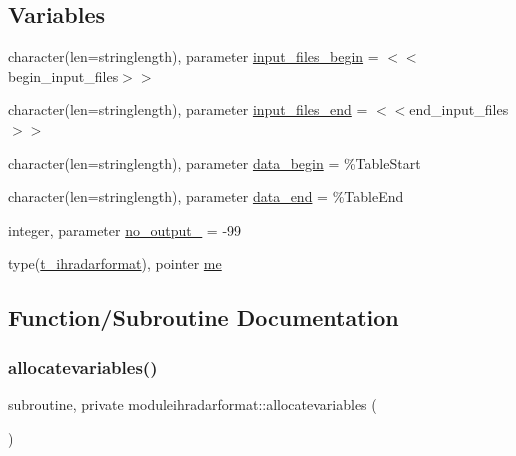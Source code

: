 \subsection*{Variables}
\begin{DoxyCompactItemize}
\item 
character(len=stringlength), parameter \mbox{\hyperlink{namespacemoduleihradarformat_a872caa24e241015b723a32676f702a85}{input\+\_\+files\+\_\+begin}} = \textquotesingle{}$<$$<$begin\+\_\+input\+\_\+files$>$$>$\textquotesingle{}
\item 
character(len=stringlength), parameter \mbox{\hyperlink{namespacemoduleihradarformat_a725e820b1ca4be9c91c2e636da468f27}{input\+\_\+files\+\_\+end}} = \textquotesingle{}$<$$<$end\+\_\+input\+\_\+files$>$$>$\textquotesingle{}
\item 
character(len=stringlength), parameter \mbox{\hyperlink{namespacemoduleihradarformat_a0280cbcdc12bde5023d64c330dec8291}{data\+\_\+begin}} = \textquotesingle{}\%Table\+Start\textquotesingle{}
\item 
character(len=stringlength), parameter \mbox{\hyperlink{namespacemoduleihradarformat_a6c10206edf04ac8656a295f742f82063}{data\+\_\+end}} = \textquotesingle{}\%Table\+End\textquotesingle{}
\item 
integer, parameter \mbox{\hyperlink{namespacemoduleihradarformat_ae0ba5f7cd624c09fd6bc98d96abb6fb6}{no\+\_\+output\+\_\+}} = -\/99
\item 
type(\mbox{\hyperlink{structmoduleihradarformat_1_1t__ihradarformat}{t\+\_\+ihradarformat}}), pointer \mbox{\hyperlink{namespacemoduleihradarformat_a14fd264aff99a0e5a137305aada23b50}{me}}
\end{DoxyCompactItemize}


\subsection{Function/\+Subroutine Documentation}
\mbox{\label{namespacemoduleihradarformat_a5e6d5ce963365079322d81b8c5030265}} 
\subsubsection{\texorpdfstring{allocatevariables()}{allocatevariables()}}
{\footnotesize\ttfamily subroutine, private moduleihradarformat\+::allocatevariables (\begin{DoxyParamCaption}{ }\end{DoxyParamCaption})\hspace{0.3cm}{\ttfamily [private]}}

